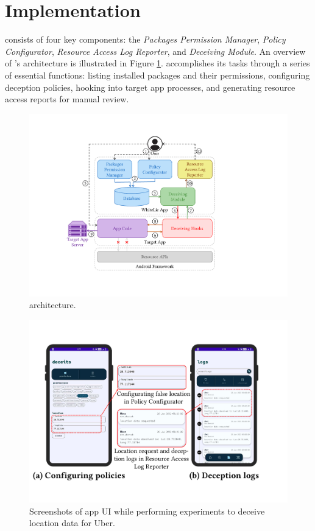 \newpage
\section{Implementation}
\label{sec:architecture}

\framework{} consists of four key components: the \textit{Packages Permission Manager}, \textit{Policy Configurator}, \textit{Resource Access Log Reporter}, and \textit{Deceiving Module}. An overview of \framework{}'s architecture is illustrated in Figure \ref{fig:method_frmwrkArch}. \framework{} accomplishes its tasks through a series of essential functions: listing installed packages and their permissions, configuring deception policies, hooking into target app processes, and generating resource access reports for manual review.

\begin{figure}[t]
    \centering
    \includegraphics[width=0.65\linewidth]{Figures/Methodology/deceiver_working_architecture.pdf}
    \caption{\framework{} architecture.}
    \label{fig:method_frmwrkArch}
\end{figure}

\begin{figure}[t]
    \centering
    \includegraphics[width=0.75\linewidth]{Figures/Case Studies/whitelie_screenshots.pdf}
    \caption{Screenshots of \framework{} app UI while performing experiments to deceive location data for Uber.}
    \label{fig:frmwrk-ui}
\end{figure}

